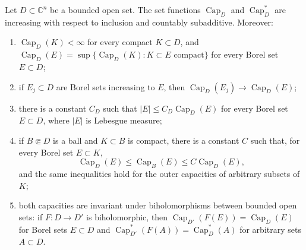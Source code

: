 \begin{proposition}\label{prop:bt-capacity-basic}
Let $D\subset\mathbb C^n$ be a bounded open set. The set functions $\operatorname{Cap}_D$ and $\operatorname{Cap}^*_D$ are increasing with respect to inclusion and countably subadditive. Moreover:
\begin{enumerate}
\item $\operatorname{Cap}_D(K)<\infty$ for every compact $K\subset D$, and $\operatorname{Cap}_D(E)=\sup\{\operatorname{Cap}_D(K):K\subset E\text{ compact}\}$ for every Borel set $E\subset D$;
\item if $E_j\subset D$ are Borel sets increasing to $E$, then $\operatorname{Cap}_D(E_j)\to\operatorname{Cap}_D(E)$;
\item there is a constant $C_D$ such that $|E|\le C_D\operatorname{Cap}_D(E)$ for every Borel set $E\subset D$, where $|E|$ is Lebesgue measure;
\item if $B\Subset D$ is a ball and $K\subset B$ is compact, there is a constant $C$ such that, for every Borel set $E\subset K$,
\[
 \operatorname{Cap}_D(E)\le\operatorname{Cap}_B(E)
                              \le C\operatorname{Cap}_D(E),
\]
and the same inequalities hold for the outer capacities of arbitrary subsets of $K$;
\item both capacities are invariant under biholomorphisms between bounded open sets: if $F\colon D\to D'$ is biholomorphic, then $\operatorname{Cap}_{D'}(F(E))=\operatorname{Cap}_D(E)$ for Borel sets $E\subset D$ and $\operatorname{Cap}^*_{D'}(F(A))=\operatorname{Cap}^*_D(A)$ for arbitrary sets $A\subset D$.
\end{enumerate}
\end{proposition}
